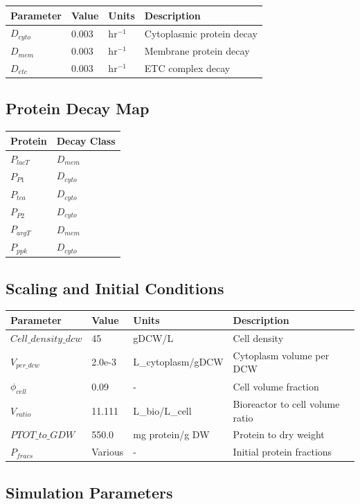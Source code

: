 \documentclass{article}
\begin{document}
\begin{tabular}{@{}llll@{}}
\toprule
Parameter & Value & Units & Description \\
\midrule
$D_{cyto}$ & 0.003 & hr$^{-1}$ & Cytoplasmic protein decay \\
$D_{mem}$ & 0.003 & hr$^{-1}$ & Membrane protein decay \\
$D_{etc}$ & 0.003 & hr$^{-1}$ & ETC complex decay \\
\bottomrule
\end{tabular}

\subsection{Protein Decay Map}

\begin{tabular}{@{}ll@{}}
\toprule
Protein & Decay Class \\
\midrule
$P_{lacT}$ & $D_{mem}$ \\
$P_{P1}$ & $D_{cyto}$ \\
$P_{tca}$ & $D_{cyto}$ \\
$P_{P2}$ & $D_{cyto}$ \\
$P_{argT}$ & $D_{mem}$ \\
$P_{ppk}$ & $D_{cyto}$ \\
\bottomrule
\end{tabular}

\subsection{Scaling and Initial Conditions}

\begin{tabular}{@{}llll@{}}
\toprule
Parameter & Value & Units & Description \\
\midrule
$Cell\_density\_dcw$ & 45 & gDCW/L & Cell density \\
$V_{per\_dcw}$ & 2.0e-3 & L\_cytoplasm/gDCW & Cytoplasm volume per DCW \\
$\phi_{cell}$ & 0.09 & - & Cell volume fraction \\
$V_{ratio}$ & 11.111 & L\_bio/L\_cell & Bioreactor to cell volume ratio \\
$PTOT\_to\_GDW$ & 550.0 & mg protein/g DW & Protein to dry weight \\
$P_{fracs}$ & Various & - & Initial protein fractions \\
\bottomrule
\end{tabular}

\subsection{Simulation Parameters}
\end{document}
